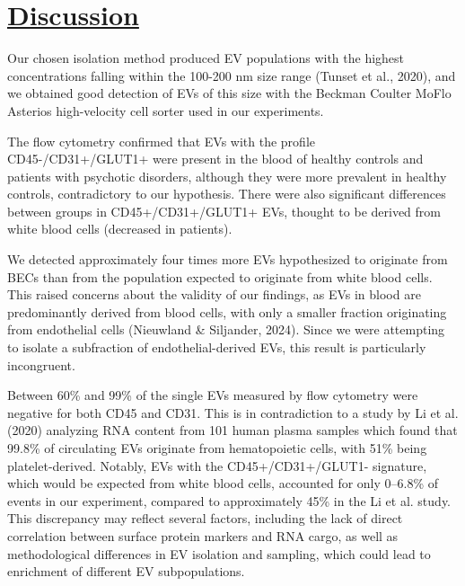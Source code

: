 \documentclass[authordate, empirical]{jote-new-article}
\begin{document}
	\section{\underline{Discussion}}



	Our chosen isolation method produced EV populations with the highest concentrations falling within the 100-200 nm size range (Tunset et al., 2020), and we obtained good detection of EVs of this size with the Beckman Coulter MoFlo Asterios high-velocity cell sorter used in our experiments.



	The flow cytometry confirmed that EVs with the profile CD45-/CD31+/GLUT1+ were present in the blood of healthy controls and patients with psychotic disorders, although they were more prevalent in healthy controls, contradictory to our hypothesis. There were also significant differences between groups in CD45+/CD31+/GLUT1+ EVs, thought to be derived from white blood cells (decreased in patients).



	We detected approximately four times more EVs hypothesized to originate from BECs than from the population expected to originate from white blood cells. This raised concerns about the validity of our findings, as EVs in blood are predominantly derived from blood cells, with only a smaller fraction originating from endothelial cells (Nieuwland \& Siljander, 2024). Since we were attempting to isolate a subfraction of endothelial-derived EVs, this result is particularly incongruent.



	Between 60\% and 99\% of the single EVs measured by flow cytometry were negative for both CD45 and CD31. This is in contradiction to a study by Li et al. (2020) analyzing RNA content from 101 human plasma samples which found that 99.8\% of circulating EVs originate from hematopoietic cells, with 51\% being platelet-derived. Notably, EVs with the CD45+/CD31+/GLUT1- signature, which would be expected from white blood cells, accounted for only 0--6.8\% of events in our experiment, compared to approximately 45\% in the Li et al. study. This discrepancy may reflect several factors, including the lack of direct correlation between surface protein markers and RNA cargo, as well as methodological differences in EV isolation and sampling, which could lead to enrichment of different EV subpopulations.
\end{document}
